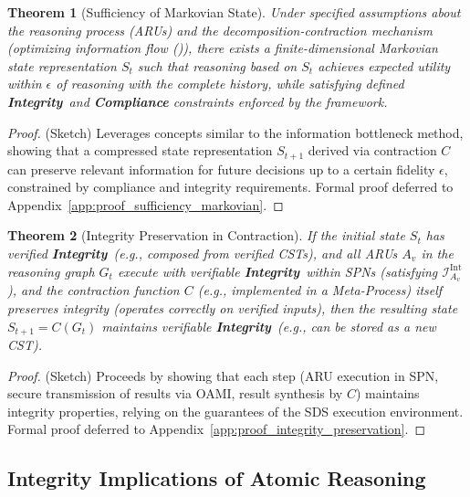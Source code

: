 \documentclass[12pt,a4paper]{report}
\renewcommand{\citep}[1]{\textit{\scriptsize{(\cite{#1})}}}
\newtheorem{theorem}{Theorem}[section]
\newcommand{\Integrity}{\textbf{Integrity}}
\begin{document}
	\begin{theorem}[Sufficiency of Markovian State]
		\label{thm:sufficiency}
		Under specified assumptions about the reasoning process (ARUs) and the decomposition-contraction mechanism (optimizing information flow \citep{Tishby2000InformationBottleneck}), there exists a finite-dimensional Markovian state representation $S_t$ such that reasoning based on $S_t$ achieves expected utility within $\epsilon$ of reasoning with the complete history, while satisfying defined \Integrity\ and \textbf{Compliance} constraints enforced by the framework.
	\end{theorem}
	\begin{proof}
		(Sketch) Leverages concepts similar to the information bottleneck method, showing that a compressed state representation $S_{t+1}$ derived via contraction $C$ can preserve relevant information for future decisions up to a certain fidelity $\epsilon$, constrained by compliance and integrity requirements. Formal proof deferred to Appendix~\ref{app:proof_sufficiency_markovian}.
	\end{proof}
	
	\begin{theorem}[Integrity Preservation in Contraction]
		\label{thm:integrity_preservation}
		If the initial state $S_t$ has verified \Integrity\ (e.g., composed from verified CSTs), and all ARUs $A_v$ in the reasoning graph $G_t$ execute with verifiable \Integrity\ within SPNs (satisfying $\mathcal{I}_{A_v}^{\text{Int}}$), and the contraction function $C$ (e.g., implemented in a Meta-Process) itself preserves integrity (operates correctly on verified inputs), then the resulting state $S_{t+1} = C(G_t)$ maintains verifiable \Integrity\ (e.g., can be stored as a new CST).
	\end{theorem}
	\begin{proof}
		(Sketch) Proceeds by showing that each step (ARU execution in SPN, secure transmission of results via OAMI, result synthesis by $C$) maintains integrity properties, relying on the guarantees of the SDS execution environment. Formal proof deferred to Appendix~\ref{app:proof_integrity_preservation}.
	\end{proof}
	
	\subsection{Integrity Implications of Atomic Reasoning}
	\label{sec:2-4-8}
	
\end{document}
